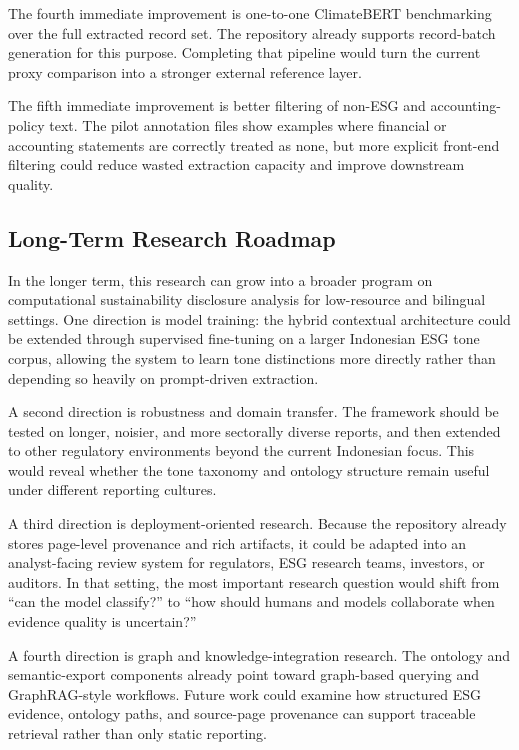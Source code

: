 The fourth immediate improvement is one-to-one ClimateBERT benchmarking over the full extracted record set. The repository already supports record-batch generation for this purpose. Completing that pipeline would turn the current proxy comparison into a stronger external reference layer.

The fifth immediate improvement is better filtering of non-ESG and accounting-policy text. The pilot annotation files show examples where financial or accounting statements are correctly treated as none, but more explicit front-end filtering could reduce wasted extraction capacity and improve downstream quality.
\subsection{Long-Term Research Roadmap}

In the longer term, this research can grow into a broader program on computational sustainability disclosure analysis for low-resource and bilingual settings. One direction is model training: the hybrid contextual architecture could be extended through supervised fine-tuning on a larger Indonesian ESG tone corpus, allowing the system to learn tone distinctions more directly rather than depending so heavily on prompt-driven extraction.

A second direction is robustness and domain transfer. The framework should be tested on longer, noisier, and more sectorally diverse reports, and then extended to other regulatory environments beyond the current Indonesian focus. This would reveal whether the tone taxonomy and ontology structure remain useful under different reporting cultures.

A third direction is deployment-oriented research. Because the repository already stores page-level provenance and rich artifacts, it could be adapted into an analyst-facing review system for regulators, ESG research teams, investors, or auditors. In that setting, the most important research question would shift from “can the model classify?” to “how should humans and models collaborate when evidence quality is uncertain?”

A fourth direction is graph and knowledge-integration research. The ontology and semantic-export components already point toward graph-based querying and GraphRAG-style workflows. Future work could examine how structured ESG evidence, ontology paths, and source-page provenance can support traceable retrieval rather than only static reporting.

